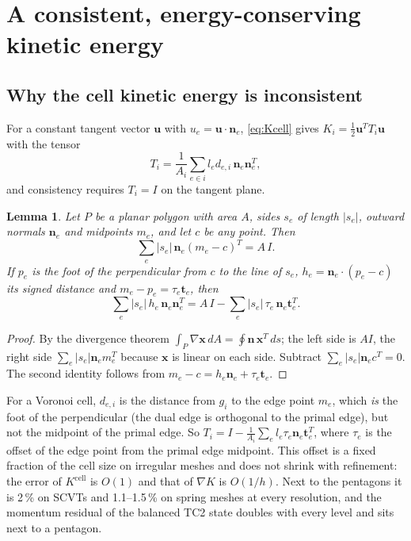 \documentclass[11pt,a4paper]{article}
\newcommand{\bu}{\mathbf{u}}
\newcommand{\bx}{\mathbf{x}}
\newcommand{\bn}{\mathbf{n}}
\newcommand{\bt}{\mathbf{t}}
\newtheorem{lemma}{Lemma}
\begin{document}
\section{A consistent, energy-conserving kinetic energy}
\label{sec:kinetic}

\subsection{Why the cell kinetic energy is inconsistent}

For a constant tangent vector $\bu$ with $u_e = \bu\cdot\bn_e$,
\eqref{eq:Kcell} gives $K_i = \tfrac12\bu^TT_i\bu$ with the tensor
\[
  T_i = \frac1{A_i}\sum_{e\in i} l_ed_{e,i}\,\bn_e\bn_e^T,
\]
and consistency requires $T_i = I$ on the tangent plane.
\begin{lemma}
\label{lem:polygon}
Let $P$ be a planar polygon with area $A$, sides $s_e$ of length $|s_e|$, outward
normals $\bn_e$ and midpoints $m_e$, and let $c$ be any point. Then
\begin{equation}
  \sum_e |s_e|\,\bn_e(m_e - c)^T = A\,I .
\end{equation}
If $p_e$ is the foot of the perpendicular from $c$ to the line of $s_e$,
$h_e = \bn_e\cdot(p_e - c)$ its signed distance and $m_e - p_e = \tau_e\bt_e$, then
\begin{equation}
  \sum_e |s_e|\,h_e\,\bn_e\bn_e^T = A\,I - \sum_e|s_e|\,\tau_e\,\bn_e\bt_e^T .
\end{equation}
\end{lemma}
\begin{proof}
By the divergence theorem $\int_P\nabla\bx\,dA = \oint\bn\,\bx^T\,ds$; the left
side is $AI$, the right side $\sum_e|s_e|\bn_em_e^T$ because $\bx$ is linear on
each side. Subtract $\sum_e|s_e|\bn_e c^T = 0$. The second identity follows from
$m_e - c = h_e\bn_e + \tau_e\bt_e$.
\end{proof}
For a Voronoi cell, $d_{e,i}$ is the distance from $g_i$ to the edge point $m_e$,
which \emph{is} the foot of the perpendicular (the dual edge is orthogonal to the
primal edge), but not the midpoint of the primal edge. So
$T_i = I - \frac1{A_i}\sum_e l_e\tau_e\bn_e\bt_e^T$, where $\tau_e$ is the offset of
the edge point from the primal edge midpoint. This offset is a fixed fraction
of the cell size on irregular meshes and does not shrink with refinement: the
error of $K^{\mathrm{cell}}$ is $O(1)$ and that of $\nabla K$ is $O(1/h)$. Next
to the pentagons it is 2\,\% on SCVTs and 1.1--1.5\,\% on spring meshes at every
resolution, and the momentum residual of the balanced TC2 state doubles with
every level and sits next to a pentagon.
\end{document}
